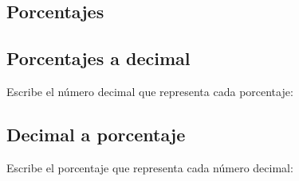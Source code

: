 \documentclass[12pt,addpoints,answers]{evalua}
\begin{document}
\begin{questions}
	\section{Porcentajes}

      
	\subsection{Porcentajes a decimal}


      \question[4] Escribe el número decimal que representa cada porcentaje:

      \begin{multicols}{2}
      \end{multicols}

      
	\subsection{Decimal a porcentaje}

      \question[4] Escribe el porcentaje que representa cada número decimal:

      \begin{multicols}{2}
\end{multicols}
\end{questions}
\end{document}
